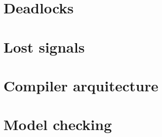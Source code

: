 \documentclass[../Thesis.tex]{subfiles}
\begin{document}
\section{Deadlocks}

\section{Lost signals}

\section{Compiler arquitecture}

\section{Model checking}
\end{document}
